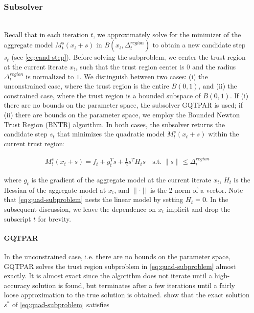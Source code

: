 \subsubsection{Subsolver}
\label{subsubsec:subsolver}
\hfill\\

\noindent Recall that in each iteration $t$, we approximately solve for the minimizer of the aggregate model
$M_{t}^{s} (x_t + s)$ in $B(x_t, \Delta_t^{region})$ to obtain a new candidate step $s_t$ (see \ref{eq:cand-step}). Before solving the subproblem, we center the trust region at the current iterate $x_t$, such that the trust region center is $0$ and the radius $\Delta^{region}_{t}$ is normalized to $1$.
We distinguish between two cases: (i) the unconstrained case, where the trust region is the entire $B(0, 1)$, and (ii) the constrained case, where the trust region is a bounded subspace of $B(0, 1)$.
If (i) there are no bounds on the parameter space, the subsolver GQTPAR is used; if (ii) there
are bounds on the parameter space, we employ the Bounded Newton Trust Region (BNTR) algorithm.
In both cases, the subsolver returns the candidate step $s_t$ that minimizes the quadratic model $M_{t}^{s} (x_t + s)$
within the current trust region:



\begin{align}
    M_{t}^{s} (x_t + s) = f_t + g_t^T s + \frac{1}{2} s^T H_t s \quad \text{s.t.} \ \lVert s \rVert \leq \Delta^{region}_{t}
    \label{eq:quad-subproblem}
\end{align}

where $g_t$ is the gradient of the aggregate model at the current iterate $x_t$, $H_t$ is the 
Hessian of the aggregate model at $x_t$, and $\lVert\cdot\rVert$ is the 2-norm of a vector. 
Note that \ref{eq:quad-subproblem} nests the linear model by setting $H_t=0$. 
In the subsequent discussion, we leave the dependence on $x_t$ implicit and drop the subscript $t$ for brevity. %

\paragraph{GQTPAR}

In the unconstrained case, i.e. there are no bounds on the parameter space, GQTPAR solves the trust region
subproblem in \ref{eq:quad-subproblem} almost exactly. It is almost exact since the algorithm does not iterate until a high-accuracy solution is found, but terminates after a few iterations until a fairly loose approximation to the true solution is obtained.\cite{More1983} show that the exact solution $s^*$ of \ref{eq:quad-subproblem} satisfies

